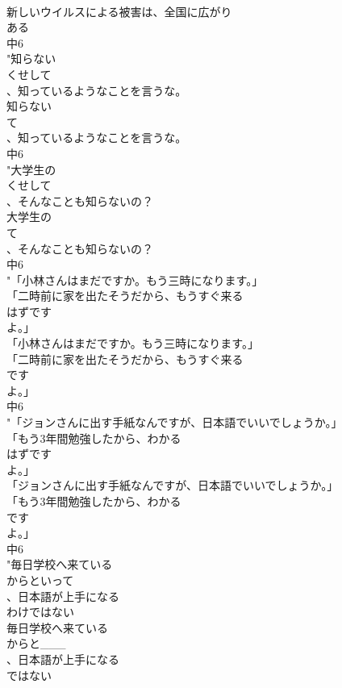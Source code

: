 \documentclass[8pt]{extreport}
\begin{document}
\begin{CJK}{UTF8}{min}
\\	新しいウイルスによる被害は、全国に広がり
\\	ある
\\	中6
\\	"知らない
\\	くせして
\\	、知っているようなことを言うな。
\\	知らない
\\	て
\\	、知っているようなことを言うな。
\\	中6
\\	"大学生の
\\	くせして
\\	、そんなことも知らないの？
\\	大学生の
\\	て
\\	、そんなことも知らないの？
\\	中6
\\	"「小林さんはまだですか。もう三時になります。」
\\	「二時前に家を出たそうだから、もうすぐ来る
\\	はずです
\\	よ。」
\\	「小林さんはまだですか。もう三時になります。」
\\	「二時前に家を出たそうだから、もうすぐ来る
\\	です
\\	よ。」
\\	中6
\\	"「ジョンさんに出す手紙なんですが、日本語でいいでしょうか。」
\\	「もう3年間勉強したから、わかる
\\	はずです
\\	よ。」
\\	「ジョンさんに出す手紙なんですが、日本語でいいでしょうか。」
\\	「もう3年間勉強したから、わかる
\\	です
\\	よ。」
\\	中6
\\	"毎日学校へ来ている
\\	からといって
\\	、日本語が上手になる
\\	わけではない
\\	毎日学校へ来ている
\\	からと___
\\	、日本語が上手になる
\\	ではない

\end{CJK}
\end{document}

